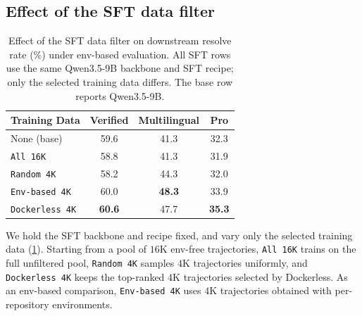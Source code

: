 \documentclass[]{arxiv_template}
\newcommand{\approach}{Dockerless\xspace}
\begin{document}


\subsection{Effect of the SFT data filter}
\label{sec:sft-filter}
\begin{table}[t]
\centering
\small
\begin{tabular}{lccc}
\toprule
\textbf{Training Data}
& \textbf{Verified}
& \textbf{Multilingual}
& \textbf{Pro} \\
\midrule
None (base) & 59.6 & 41.3 & 32.3 \\
\texttt{All 16K}         & 58.8 & 41.3 & 31.9 \\
\midrule
\texttt{Random 4K}       & 58.2 & 44.3 & 32.0 \\
\texttt{Env-based 4K}    & 60.0 & \textbf{48.3} & 33.9 \\
\rowcolor{black!4} \texttt{\approach 4K} & \textbf{60.6} & 47.7 & \textbf{35.3} \\
\bottomrule
\end{tabular}%
\caption{
Effect of the SFT data filter on downstream resolve rate (\%) under env-based evaluation.
All SFT rows use the same Qwen3.5-9B backbone and SFT recipe; only the selected training data differs.
The base row reports Qwen3.5-9B.
}
\label{tab:sft-same-scale}
\end{table}

We hold the SFT backbone and recipe fixed, and vary only the selected training data (\cref{tab:sft-same-scale}).
Starting from a pool of $16$K env-free trajectories, \texttt{All 16K} trains on the full unfiltered pool, \texttt{Random 4K} samples $4$K trajectories uniformly, and \texttt{\approach 4K} keeps the top-ranked $4$K trajectories selected by \approach.
As an env-based comparison, \texttt{Env-based 4K} uses $4$K trajectories obtained with per-repository environments.
\end{document}
